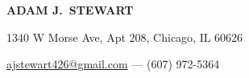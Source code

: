 

\begin{center}

    \textbf{\uppercase{\Large Adam J.\ Stewart}}

    1340 W Morse Ave, Apt 208, Chicago, IL 60626

    \href{mailto:ajstewart426@gmail.com}{ajstewart426@gmail.com} --- (607) 972-5364

\end{center}

\vspace{-14pt}
